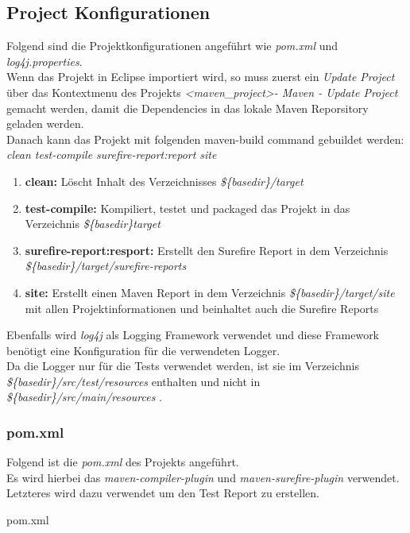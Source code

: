 \documentclass[11pt, a4paper, twoside]{article}   	%
\newenvironment{code}{\captionsetup{type=listing}}{}
\begin{document}
\subsection{Project Konfigurationen}
Folgend sind die Projektkonfigurationen angeführt wie \emph{pom.xml} und \emph{log4j.properties}.\\
Wenn das Projekt in Eclipse importiert wird, so muss zuerst ein \emph{Update Project} über das Kontextmenu des Projekts \emph{\textless maven\_project\textgreater - Maven - Update Project} gemacht werden, damit die Dependencies in das lokale Maven Reporsitory geladen werden.\\
Danach kann das Projekt mit folgenden maven-build command gebuildet werden:\\
\emph{clean test-compile surefire-report:report site}
\begin{enumerate}
	\item \textbf{clean:} Löscht Inhalt des Verzeichnisses \emph{\$\{basedir\}/target}
	\item \textbf{test-compile:} Kompiliert, testet und packaged das Projekt in das Verzeichnis \emph{\$\{basedir\}target}
	\item \textbf{surefire-report:resport:} Erstellt den Surefire Report in dem Verzeichnis \emph{\$\{basedir\}/target/surefire-reports}
	\item \textbf{site:} Erstellt einen Maven Report in dem Verzeichnis \emph{\$\{basedir\}/target/site} mit allen Projektinformationen und beinhaltet auch die Surefire Reports
\end{enumerate}
Ebenfalls wird \emph{log4j} als Logging Framework verwendet und diese Framework benötigt eine Konfiguration für die verwendeten Logger.\\
Da die Logger nur für die Tests verwendet werden, ist sie im Verzeichnis \emph{\$\{basedir\}/src/test/resources} enthalten und nicht in \emph{\$\{basedir\}/src/main/resources} .\\

\subsubsection{pom.xml}
Folgend ist die \emph{pom.xml} des Projekts angeführt.\\
Es wird hierbei das \emph{maven-compiler-plugin} und \emph{maven-surefire-plugin} verwendet. Letzteres wird dazu verwendet um den Test Report zu erstellen.
\begin{code}
	\caption{pom.xml}
\end{code}
\end{document}
